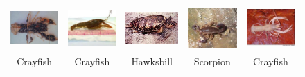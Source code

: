 \begin{figure}[H]
\begin{tabular}{ccccc}
\includegraphics[width=3cm]{Figures/crab/11.jpg}
&
\includegraphics[width=3cm]{Figures/crab/12.jpg}
&
\includegraphics[width=3cm]{Figures/crab/13.jpg}
&
\includegraphics[width=3cm]{Figures/crab/14.jpg}
&
\includegraphics[width=3cm]{Figures/crab/15.jpg}\\
Crayfish & Crayfish & Hawksbill & Scorpion & Crayfish\\




\end{tabular}
\end{figure}
